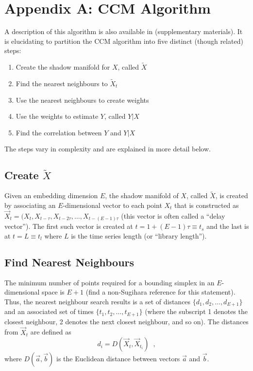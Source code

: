 \documentclass[a4paper,11pt]{article}
\begin{document}
\section{Appendix A: CCM Algorithm}
\label{sec:appA}
A description of this algorithm is also available in \cite{Sugihara2012} (supplementary materials).  It is elucidating to partition the CCM algorithm into five distinct (though related) steps:
\begin{enumerate}
\item Create the shadow manifold for $X$, called $\tilde{X}$
\item Find the nearest neighbours to $\tilde{X}_t$
\item Use the nearest neighbours to create weights
\item Use the weights to estimate $Y$, called $Y|X$
\item Find the correlation between $Y$ and $Y|X$ 
\end{enumerate}
The steps vary in complexity and are explained in more detail below.

\subsection{Create $\tilde{X}$}
Given an embedding dimension $E$, the shadow manifold of $X$, called $\tilde{X}$, is created by associating an $E$-dimensional vector to each point $X_t$ that is constructed as $\vec{X}_t=(X_t,X_{t-\tau},X_{t-2\tau},\ldots,X_{t-(E-1)\tau}$ (this vector is often called a ``delay vector'').  The first such vector is created at $t=1+(E-1)\tau\equiv t_s$ and the last is at $t=L\equiv t_l$ where $L$ is the time series length (or ``library length'').  

\subsection{Find Nearest Neighbours}
The minimum number of points required for a bounding simplex in an $E$-dimensional space is $E+1$ (find a non-Sugihara reference for this statement).  Thus, the nearest neighbour search results is a set of distances $\{d_1,d_2,\ldots,d_{E+1}\}$ and an associated set of times $\{t_1,t_2,\ldots,t_{E+1}\}$ (where the subscript 1 denotes the closest neighbour, 2 denotes the next closest neighbour, and so on).  The distances from $\vec{X}_t$ are defined as
$$
d_i = D\left(\vec{X}_t,\vec{X}_{t_i}\right)\;\;,
$$
where $D(\vec{a},\vec{b})$ is the Euclidean distance between vectors $\vec{a}$ and $\vec{b}$.
\end{document}
